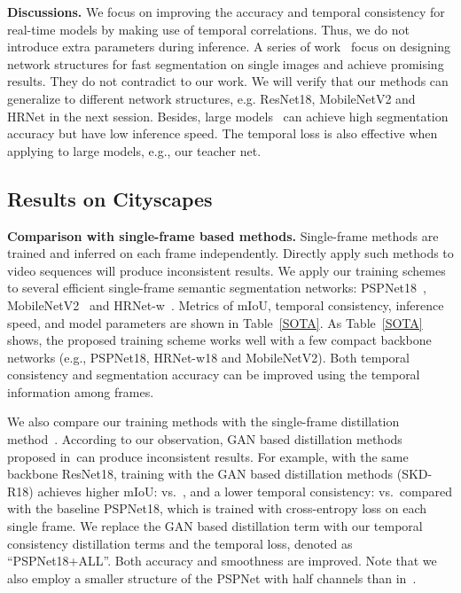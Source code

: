 \documentclass[runningheads]{llncs}
\begin{document}
\noindent \textbf{Discussions.}
We focus on improving the accuracy and temporal consistency for real-time models by making use of temporal correlations. Thus, we do not introduce extra parameters during inference. A series of work~\cite{zhao2017icnet,yu2018bisenet,orsic2019defense} focus on designing network structures for fast segmentation on single images and achieve promising results. They do not contradict to our work. We will verify that our methods can generalize to different network structures, e.g. ResNet18, MobileNetV2 and HRNet in the next session. Besides, large models~\cite{zhao2017pyramid,zhu2019improving} can achieve high segmentation accuracy but have low inference speed. The temporal loss is also effective when applying to large models, e.g., our teacher net.

\subsection{Results on Cityscapes}

\noindent\textbf{Comparison with single-frame based methods.}
Single-frame methods are trained and inferred on each frame independently. Directly apply such methods to video sequences will produce inconsistent results. We apply our training schemes to several efficient single-frame semantic segmentation networks: PSPNet18~\cite{zhao2017pyramid}, MobileNetV2~\cite{Sandler2018MobileNetV2IR} and HRNet-w~\cite{SunZJCXLMWLW19,SunXLW19}.
Metrics of
mIoU, temporal consistency, inference speed, and model parameters are shown in Table~\ref{SOTA}.  As Table~\ref{SOTA} shows, the proposed training scheme
works well with a few
compact backbone networks (e.g., PSPNet18, HRNet-w18 and MobileNetV2). Both temporal consistency and segmentation accuracy can be improved
using
the temporal information among frames.

We also compare our training methods with the single-frame distillation method~\cite{liu2019structured}. According to our observation, GAN based distillation methods proposed in~\cite{liu2019structured}can
produce inconsistent results. For example, with the same backbone ResNet18, training with the GAN based distillation methods (SKD-R18)
achieves higher mIoU:  vs.\  , and a lower temporal consistency:  vs.\   compared with the baseline PSPNet18, which is trained with cross-entropy loss on each single frame.
We replace the GAN based distillation term with our temporal consistency distillation terms and the temporal loss,
denoted as ``PSPNet18+ALL''. Both accuracy and smoothness are improved. Note that we also employ a smaller structure of the PSPNet with half channels than in~\cite{liu2019structured}.
\end{document}
